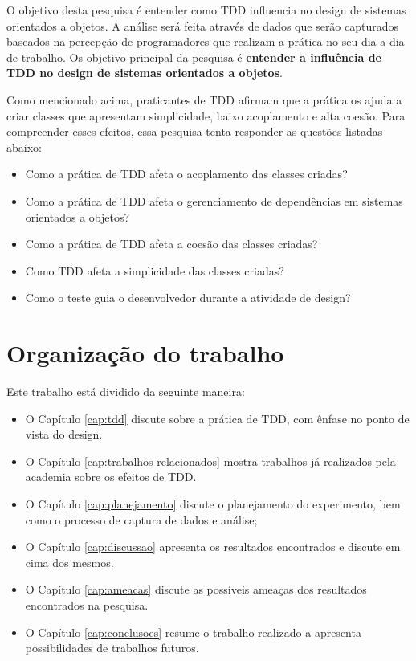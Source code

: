 O objetivo desta pesquisa é entender como TDD influencia no design de sistemas
orientados a objetos. A análise será feita através de dados que serão
capturados baseados na percepção de programadores que realizam a prática no seu
dia-a-dia de trabalho.
Os objetivo principal da pesquisa é \textbf{entender a influência de TDD no
design de sistemas orientados a objetos}.

Como mencionado acima, praticantes de TDD afirmam que a prática os ajuda a criar
classes que apresentam simplicidade, baixo acoplamento e alta coesão. Para
compreender esses efeitos, essa pesquisa tenta responder as questões listadas
abaixo:

\begin{itemize}

  \item Como a prática de TDD afeta o acoplamento das classes criadas?

  \item Como a prática de TDD afeta o gerenciamento de dependências em sistemas
  orientados a objetos?

  \item Como a prática de TDD afeta a coesão das classes criadas?

  \item Como TDD afeta a simplicidade das classes criadas?

  \item Como o teste guia o desenvolvedor durante a atividade de
  design?

\end{itemize}

\section{Organização do trabalho}

Este trabalho está dividido da seguinte maneira: 

\begin{itemize}
	\item O Capítulo \ref{cap:tdd} discute sobre a prática de TDD, com ênfase no
	ponto de vista do design.
  
	\item O Capítulo \ref{cap:trabalhos-relacionados} mostra trabalhos já
	realizados pela academia sobre os efeitos de TDD.

	\item O Capítulo \ref{cap:planejamento} discute o planejamento do experimento,
	bem como o processo de captura de dados e análise;

	\item O Capítulo \ref{cap:discussao} apresenta os resultados encontrados e
	discute em cima dos mesmos.
	
	\item O Capítulo \ref{cap:ameacas} discute as possíveis ameaças dos resultados
	encontrados na pesquisa.
	
	\item O Capítulo \ref{cap:conclusoes} resume o trabalho realizado a apresenta
	possibilidades de trabalhos futuros.
\end{itemize}
